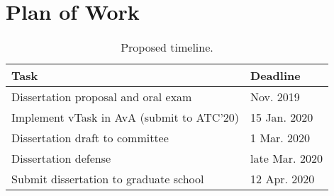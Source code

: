 \section{Plan of Work}
\begin{table}[htp!]
\centering
\begin{tabular}{ll}
\toprule
Task 											& Deadline \\
\midrule
Dissertation proposal and oral exam				& Nov. 2019 \\
Implement vTask in AvA (submit to ATC'20) 		& 15 Jan. 2020 \\
Dissertation draft to committee					& 1 Mar. 2020 \\
Dissertation defense							& late Mar. 2020 \\
Submit dissertation to graduate school 			& 12 Apr. 2020 \\
\bottomrule
\end{tabular}
\caption{Proposed timeline.}
\label{tab:timeline}
\end{table}